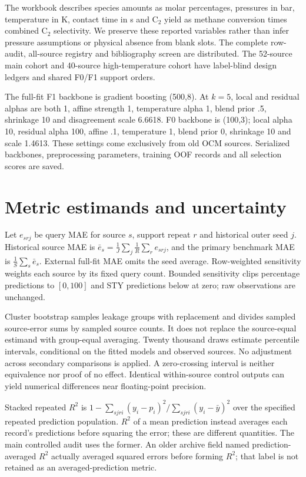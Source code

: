 \documentclass[11pt]{article}
\begin{document}
The workbook describes species amounts as molar percentages, pressures in bar, temperature in K, contact time in s and C$_2$ yield as methane conversion times combined C$_2$ selectivity. We preserve these reported variables rather than infer pressure assumptions or physical absence from blank slots. The complete row-audit, all-source registry and bibliography screen are distributed. The 52-source main cohort and 40-source high-temperature cohort have label-blind design ledgers and shared F0/F1 support orders.

The full-fit F1 backbone is gradient boosting (500,8). At $k=5$, local and residual alphas are both 1, affine strength 1, temperature alpha 1, blend prior .5, shrinkage 10 and disagreement scale 6.6618. F0 backbone is (100,3); local alpha 10, residual alpha 100, affine .1, temperature 1, blend prior 0, shrinkage 10 and scale 1.4613. These settings come exclusively from old OCM sources. Serialized backbones, preprocessing parameters, training OOF records and all selection scores are saved.


\section{Metric estimands and uncertainty}
Let $e_{srj}$ be query MAE for source $s$, support repeat $r$ and historical outer seed $j$. Historical source MAE is $\bar e_s=\frac1J\sum_j\frac1R\sum_r e_{srj}$, and the primary benchmark MAE is $\frac1S\sum_s\bar e_s$. External full-fit MAE omits the seed average. Row-weighted sensitivity weights each source by its fixed query count. Bounded sensitivity clips percentage predictions to $[0,100]$ and STY predictions below at zero; raw observations are unchanged.

Cluster bootstrap samples leakage groups with replacement and divides sampled source-error sums by sampled source counts. It does not replace the source-equal estimand with group-equal averaging. Twenty thousand draws estimate percentile intervals, conditional on the fitted models and observed sources. No adjustment across secondary comparisons is applied. A zero-crossing interval is neither equivalence nor proof of no effect. Identical within-source control outputs can yield numerical differences near floating-point precision.

Stacked repeated $R^2$ is $1-\sum_{sjri}(y_i-p_i)^2/\sum_{sjri}(y_i-\bar y)^2$ over the specified repeated prediction population. $R^2$ of a mean prediction instead averages each record's predictions before squaring the error; these are different quantities. The main controlled audit uses the former. An older archive field named prediction-averaged $R^2$ actually averaged squared errors before forming $R^2$; that label is not retained as an averaged-prediction metric.
\end{document}
